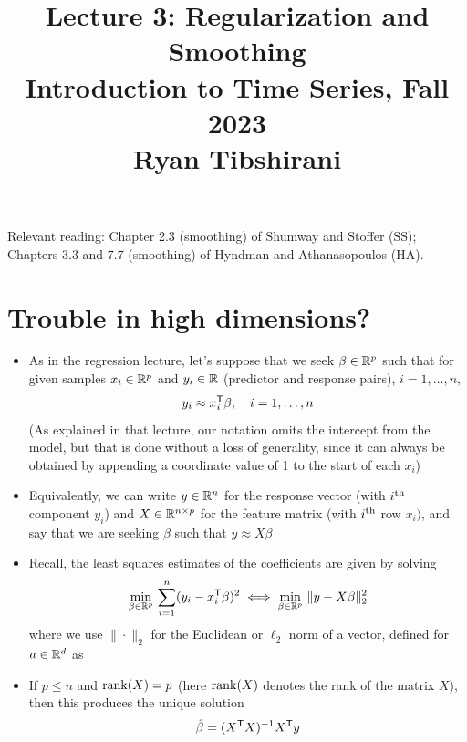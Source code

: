 \documentclass{article}
\title{Lecture 3: Regularization and Smoothing \\ \smallskip  
\large Introduction to Time Series, Fall 2023 \\ \smallskip
Ryan Tibshirani}
\date{}
\begin{document}
\maketitle
\RaggedRight
\vspace{-50pt}

Relevant reading: Chapter 2.3 (smoothing) of Shumway and Stoffer (SS); Chapters
3.3 and 7.7 (smoothing) of Hyndman and Athanasopoulos (HA).

\section{Trouble in high dimensions?} 

\def\new{\text{new}}

\begin{itemize}
\item As in the regression lecture, let's suppose that we seek $\beta \in \mathbb{R}^p$  
  such that for given samples $x_i \in \mathbb{R}^p$ and $y_i \in \mathbb{R}$ (predictor and
  response pairs), $i = 1,\dots,n$,    
  \[
  y_i \approx x_i^{\mathsf{T}} \beta, \quad  i = 1,\dots,n 
  \]
  (As explained in that lecture, our notation omits the intercept from the
  model, but that is done without a loss of generality, since it can always be
  obtained by appending a coordinate value of 1 to the start of each $x_i$) 

\item Equivalently, we can write $y \in \mathbb{R}^n$ for the response vector (with
  $i^{\textnormal{th}}$ component $y_i$) and $X \in \mathbb{R}^{n \times p}$ for the feature matrix
  (with $i^{\textnormal{th}}$ row $x_i)$, and say that we are seeking $\beta$ such that $y
  \approx X \beta$ 

\item Recall, the least squares estimates of the coefficients are given by
  solving  
  \begin{equation}
  \label{eq:ls}
  \min_{\beta \in \mathbb{R}^p} \, \sum_{i=1}^n (y_i - x_i^{\mathsf{T}} \beta)^2 \iff
  \min_{\beta \in \mathbb{R}^p} \, \|y - X \beta\|_2^2
  \end{equation}
  where we use $\|\cdot\|_2$ for the Euclidean or $\ell_2$ norm of a vector,
  defined for $a \in \mathbb{R}^d$ as 

\item If $p \leq n$ and $\operatorname{rank}(X) = p$ (here $\operatorname{rank}(X)$ denotes the rank of the 
  matrix $X$), then this produces the unique solution    
  \begin{equation}
  \label{eq:coef}
  \hat{\beta} = (X^{\mathsf{T}} X)^{-1} X^{\mathsf{T}} y  
  \end{equation}


\end{itemize}
\end{document}
